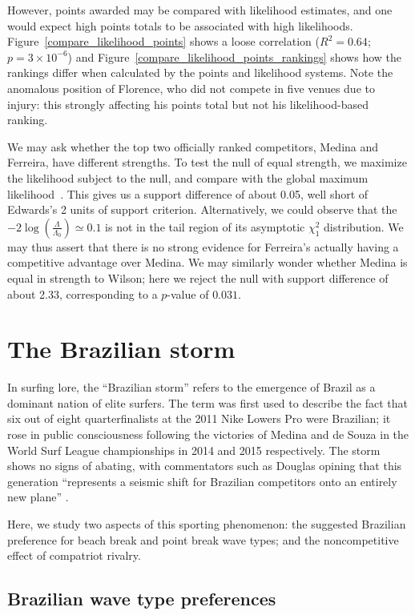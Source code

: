 \documentclass{article}
\begin{document}
However, points awarded may be compared with likelihood estimates, and
one would expect high points totals to be associated with high
likelihoods.  Figure~\ref{compare_likelihood_points} shows a loose
correlation ($R^2=0.64$; $p=3\times 10^{-6}$) and
Figure~\ref{compare_likelihood_points_rankings} shows how the rankings
differ when calculated by the points and likelihood systems.  Note the
anomalous position of Florence, who did not compete in five venues due
to injury: this strongly affecting his points total but not his
likelihood-based ranking.

We may ask whether the top two officially ranked competitors, Medina
and Ferreira, have different strengths.  To test the null of equal
strength, we maximize the likelihood subject to the null, and compare
with the global maximum likelihood~\citep{hankin2010}.  This gives us a
support difference of about 0.05, well short of Edwards's 2 units of
support criterion.  Alternatively, we could observe that the
$-2\log\left(\frac{\Lambda}{\Lambda_0}\right)\simeq 0.1$ is not in the
tail region of its asymptotic $\chi^2_1$ distribution.  We may thus
assert that there is no strong evidence for Ferreira's actually having
a competitive advantage over Medina.  We may similarly wonder whether
Medina is equal in strength to Wilson; here we reject the null with
support difference of about 2.33, corresponding to a $p$-value of
$0.031$.

\section{The Brazilian storm}

In surfing lore, the ``Brazilian storm'' refers to the emergence of
Brazil as a dominant nation of elite surfers.  The term was first used
to describe the fact that six out of eight quarterfinalists at the 2011 Nike
Lowers Pro were Brazilian; it rose in public consciousness following
the victories of Medina and de Souza in the World Surf League
championships in 2014 and 2015 respectively.  The storm shows no signs
of abating, with commentators such as Douglas opining that this
generation ``represents a seismic shift for Brazilian competitors onto
an entirely new plane'' \citep{douglas2020}.

Here, we study two aspects of this sporting phenomenon: the suggested
Brazilian preference for beach break and point break wave types; and the
noncompetitive effect of compatriot rivalry.

\subsection{Brazilian wave type preferences}
\end{document}
